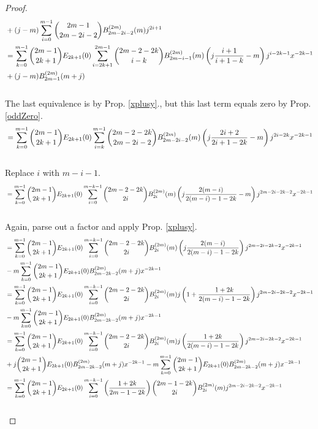\documentclass[fleqn,a4paper,9pt]{article}
\begin{document}
\begin{flushleft}
\begin{proof}
\begin{align}
&+(j-m)\sum_{i=0}^{m-1}\binom{2m-1}{2m-2i-2}B_{2m-2i-2}^{(2m)}(m)j^{2i+1}\\\notag
&=\sum_{k=0}^{m-1}\binom{2m-1}{2k+1}E_{2k+1}(0)\sum_{i=2k+1}^{2m-1}\binom{2m-2-2k}{i-k}B_{2m-i-1}^{(2m)}(m) \left(j\frac{i+1}{i+1-k}-m\right)j^{i-2k-1}x^{-2k-1}\\\notag
&+(j-m)B_{2m-1}^{(2m)}(m+j)\\\notag
\end{align}
The last equivalence is by Prop. \ref{xplusy}., but this last term equals zero by Prop. \ref{oddZero}.
\begin{align}\notag
&=\sum_{k=0}^{m-1}\binom{2m-1}{2k+1}E_{2k+1}(0)\sum_{i=k}^{m-1}\binom{2m-2-2k}{2m-2i-2}B_{2m-2i-2}^{(2m)}(m)   \left(j\frac{2i+2}{2i+1-2k}-m\right)j^{2i-2k}x^{-2k-1}\\\notag
\end{align}
Replace $i$ with $m-i-1$.
\begin{align}\notag
&=\sum_{k=0}^{m-1}\binom{2m-1}{2k+1}E_{2k+1}(0)\sum_{i=0}^{m-k-1}\binom{2m-2-2k}{2i}B_{2i}^{(2m)}(m)   \left(j\frac{2(m-i)}{2(m-i)-1-2k}-m\right)j^{2m-2i-2k-2}x^{-2k-1}\\\notag
\end{align}
Again, parse out a factor and apply Prop. \ref{xplusy}.
\begin{align}\notag
&=\sum_{k=0}^{m-1}\binom{2m-1}{2k+1}E_{2k+1}(0)\sum_{i=0}^{m-k-1}\binom{2m-2-2k}{2i}B_{2i}^{(2m)}(m)  \left(j\frac{2(m-i)}{2(m-i)-1-2k}\right)j^{2m-2i-2k-2}x^{-2k-1}\\\notag
&-m\sum_{k=0}^{m-1}\binom{2m-1}{2k+1}E_{2k+1}(0)B_{2m-2k-2}^{(2m)}(m+j)x^{-2k-1}\\\notag
&=\sum_{k=0}^{m-1}\binom{2m-1}{2k+1}E_{2k+1}(0)\sum_{i=0}^{m-k-1}\binom{2m-2-2k}{2i}B_{2i}^{(2m)}(m)  j\left(1+\frac{1+2k}{2(m-i)-1-2k}\right)j^{2m-2i-2k-2}x^{-2k-1}\\\notag
&-m\sum_{k=0}^{m-1}\binom{2m-1}{2k+1}E_{2k+1}(0)B_{2m-2k-2}^{(2m)}(m+j)x^{-2k-1}\\\notag
&=\sum_{k=0}^{m-1}\binom{2m-1}{2k+1}E_{2k+1}(0)\sum_{i=0}^{m-k-1}\binom{2m-2-2k}{2i}B_{2i}^{(2m)}(m)  j\left(\frac{1+2k}{2(m-i)-1-2k}\right)j^{2m-2i-2k-2}x^{-2k-1}\\\notag
&+j\binom{2m-1}{2k+1}E_{2k+1}(0)B_{2m-2k-2}^{(2m)}(m+j)x^{-2k-1}-m\sum_{k=0}^{m-1}\binom{2m-1}{2k+1}E_{2k+1}(0)B_{2m-2k-2}^{(2m)}(m+j)x^{-2k-1}\\\notag
&=\sum_{k=0}^{m-1}\binom{2m-1}{2k+1}E_{2k+1}(0)\sum_{i=0}^{m-k-1}\left(\frac{1+2k}{2m-1-2k}\right)\binom{2m-1-2k}{2i}B_{2i}^{(2m)}(m)  j^{2m-2i-2k-2}x^{-2k-1}\\\notag

\end{align}
\end{proof}
\end{flushleft}
\end{document}
